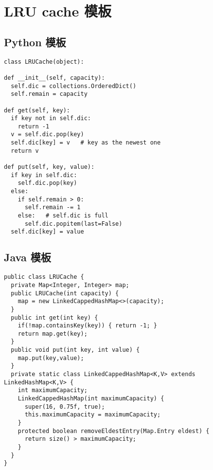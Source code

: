 \newpage
\section{LRU cache 模板}

\subsection{Python 模板}

\begin{verbatim}
class LRUCache(object):

def __init__(self, capacity):
  self.dic = collections.OrderedDict()
  self.remain = capacity

def get(self, key):
  if key not in self.dic:
    return -1
  v = self.dic.pop(key)
  self.dic[key] = v   # key as the newest one
  return v

def put(self, key, value):
  if key in self.dic:
    self.dic.pop(key)
  else:
    if self.remain > 0:
      self.remain -= 1
    else:   # self.dic is full
      self.dic.popitem(last=False)
  self.dic[key] = value
\end{verbatim}

\subsection{Java 模板}

\begin{verbatim}
public class LRUCache {
  private Map<Integer, Integer> map;
  public LRUCache(int capacity) {
    map = new LinkedCappedHashMap<>(capacity);
  }
  public int get(int key) {
    if(!map.containsKey(key)) { return -1; }
    return map.get(key);
  }
  public void put(int key, int value) {
    map.put(key,value);
  }
  private static class LinkedCappedHashMap<K,V> extends LinkedHashMap<K,V> {
    int maximumCapacity;
    LinkedCappedHashMap(int maximumCapacity) {
      super(16, 0.75f, true);
      this.maximumCapacity = maximumCapacity;
    }
    protected boolean removeEldestEntry(Map.Entry eldest) {
      return size() > maximumCapacity;
    }
  }
}
\end{verbatim}

